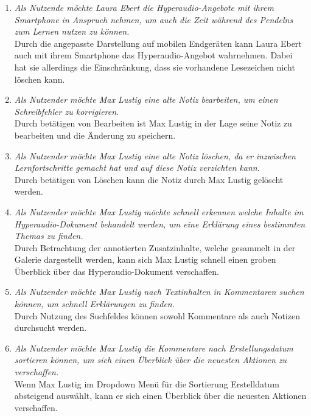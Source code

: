 \begin{enumerate}[label=US-\arabic*:,ref=US-\arabic*]
\item \label{US-Mobil} \textit{Als Nutzende möchte Laura Ebert die Hyperaudio-Angebote mit ihrem Smartphone in Anspruch nehmen, um auch die Zeit während des Pendelns zum Lernen nutzen zu können.}\\
Durch die angepasste Darstellung auf mobilen Endgeräten kann Laura Ebert auch mit ihrem Smartphone das Hyperaudio-Angebot wahrnehmen. Dabei hat sie allerdings die Einschränkung, dass sie vorhandene Lesezeichen nicht löschen kann.

\item \label{US-Notiz-Bearbeiten} \textit{Als Nutzender möchte Max Lustig eine alte Notiz bearbeiten, um einen Schreibfehler zu korrigieren.}\\
Durch betätigen von \glqq Bearbeiten\grqq{} ist Max Lustig in der Lage seine Notiz zu bearbeiten und die Änderung zu speichern.

\item \label{US-Notiz-Loeschen} \textit{Als Nutzender möchte Max Lustig eine alte Notiz löschen, da er inzwischen Lernfortschritte gemacht hat und auf diese Notiz verzichten kann.}\\
Durch betätigen von \glqq Löschen\grqq{} kann die Notiz durch Max Lustig gelöscht werden.


\item \label{US-Galerie} \textit{Als Nutzender möchte Max Lustig möchte schnell erkennen welche Inhalte im Hyperaudio-Dokument behandelt werden, um eine Erklärung eines bestimmten Themas zu finden.}\\
Durch Betrachtung der annotierten Zusatzinhalte, welche gesammelt in der Galerie dargestellt werden, kann sich Max Lustig schnell einen groben Überblick über das Hyperaudio-Dokument verschaffen.

\item \label{US-Suche} \textit{Als Nutzender möchte Max Lustig nach Textinhalten in Kommentaren suchen können, um schnell Erklärungen zu finden.}\\
Durch Nutzung des Suchfeldes können sowohl Kommentare als auch Notizen durchsucht werden.

\item \label{US-Sortierung-Erstellungsdatum} \textit{Als Nutzender möchte Max Lustig die Kommentare nach Erstellungsdatum sortieren können, um sich einen Überblick über die neuesten Aktionen zu verschaffen.}\\
Wenn Max Lustig im Dropdown Menü für die Sortierung \glqq Erstelldatum absteigend\grqq{} auswählt, kann er sich einen Überblick über die neuesten Aktionen verschaffen.


\end{enumerate}
